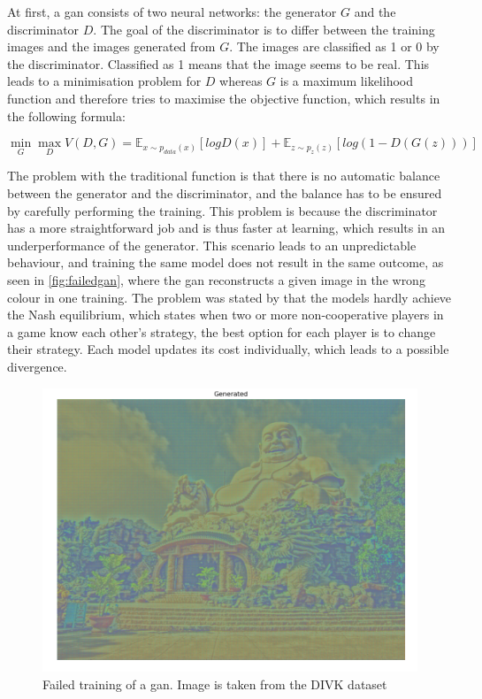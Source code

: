 \par
At first, a \gls{gan} consists of two neural networks: the generator \(G\) and the discriminator
\(D\). The goal of the discriminator is to differ between the training images and the images generated from \(G\). The images are classified as 1 or 0 by the discriminator. Classified as 1 means that the image seems to be real. This leads to a minimisation problem for \(D\) whereas \(G\) is a maximum likelihood function and therefore tries to maximise the objective function, which results in the following formula:

 \[ \min_{G} \max_{D} V(D,G)=\mathbb{E}_{x \sim p_{data}(x)}[log D(x)]+\mathbb{E}_{z \sim p_{z}(z)}[log(1- D(G(z)))] \]
 
The problem with the traditional function is that there is no automatic balance between the generator and the discriminator, and the balance has to be ensured by carefully performing the training. This problem is because the discriminator has a more straightforward job and is thus faster at learning, which results in an underperformance of the generator. This scenario leads to an unpredictable behaviour, and training the same model does not result in the same outcome, as seen in \autoref{fig:failedgan}, where the \gls{gan} reconstructs a given image in the wrong colour in one training. The problem was stated by \cite{salimans2016} that the models hardly achieve the Nash equilibrium, which states when two or more non-cooperative players in a game know each other’s strategy, the best option for each player is to change their strategy. Each model updates its cost individually, which leads to a possible divergence.

\begin{figure}
\includegraphics[width=0.9\linewidth]{logos/image_at_epoch_20000.png} 
\caption{Failed training of a \gls{gan}. Image is taken from the DIVK dataset \parencite{Agustsson2017}}
\label{fig:failedgan}
\end{figure}

